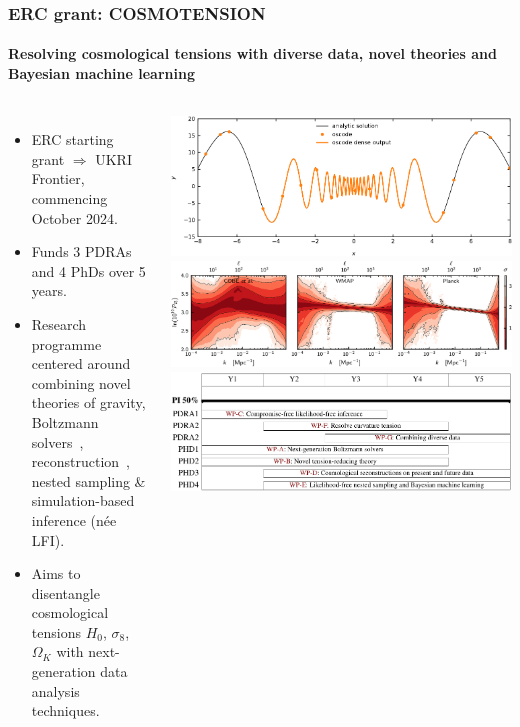 \documentclass[aspectratio=169]{beamer}
\begin{document}
\begin{frame}
    \frametitle{ERC grant: COSMOTENSION \hspace{95pt}\small {}}
    \framesubtitle{Resolving cosmological tensions with diverse data, novel theories and Bayesian machine learning}

    \begin{columns}
        \begin{itemize}
            \item ERC starting grant $\Rightarrow$ UKRI Frontier, commencing October 2024.
            \item Funds 3 PDRAs and 4 PhDs over 5 years.
            \item Research programme centered around combining novel theories of gravity, Boltzmann solvers~, reconstruction~, nested sampling \& simulation-based inference (n\'{e}e LFI).
            \item Aims to disentangle cosmological tensions $H_0$, $\sigma_8$, $\Omega_K$ with next-generation data analysis techniques.
        \end{itemize}
        \includegraphics[width=\textwidth]{figures/denseoutput.pdf}
        \includegraphics[width=\textwidth]{figures/pps.pdf}
        \includegraphics[width=\textwidth]{figures/gantt.pdf}
    \end{columns}

\end{frame}
\end{document}
